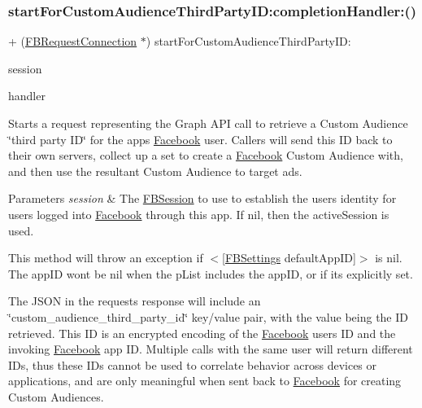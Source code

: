 \subsubsection{\texorpdfstring{start\+For\+Custom\+Audience\+Third\+Party\+I\+D\+:completion\+Handler\+:()}{startForCustomAudienceThirdPartyID:completionHandler:()}\hspace{0.1cm}{\footnotesize\ttfamily [5/5]}}
{\footnotesize\ttfamily + (\hyperlink{interfaceFBRequestConnection}{F\+B\+Request\+Connection} $\ast$) start\+For\+Custom\+Audience\+Third\+Party\+I\+D\+: \begin{DoxyParamCaption}\item[{(\hyperlink{interfaceFBSession}{F\+B\+Session} $\ast$)}]{session }\item[{completionHandler:(F\+B\+Request\+Handler)}]{handler }\end{DoxyParamCaption}}

Starts a request representing the Graph A\+PI call to retrieve a Custom Audience \char`\"{}third party I\+D\char`\"{} for the app\textquotesingle{}s \hyperlink{interfaceFacebook}{Facebook} user. Callers will send this ID back to their own servers, collect up a set to create a \hyperlink{interfaceFacebook}{Facebook} Custom Audience with, and then use the resultant Custom Audience to target ads.


\begin{DoxyParams}{Parameters}
{\em session} & The \hyperlink{interfaceFBSession}{F\+B\+Session} to use to establish the user\textquotesingle{}s identity for users logged into \hyperlink{interfaceFacebook}{Facebook} through this app. If {\ttfamily nil}, then the active\+Session is used.\\
\hline
\end{DoxyParams}
This method will throw an exception if $<$\mbox{[}\hyperlink{interfaceFBSettings}{F\+B\+Settings} default\+App\+ID\mbox{]}$>$ is {\ttfamily nil}. The app\+ID won\textquotesingle{}t be nil when the p\+List includes the app\+ID, or if it\textquotesingle{}s explicitly set.

The J\+S\+ON in the request\textquotesingle{}s response will include an \char`\"{}custom\+\_\+audience\+\_\+third\+\_\+party\+\_\+id\char`\"{} key/value pair, with the value being the ID retrieved. This ID is an encrypted encoding of the \hyperlink{interfaceFacebook}{Facebook} user\textquotesingle{}s ID and the invoking \hyperlink{interfaceFacebook}{Facebook} app ID. Multiple calls with the same user will return different I\+Ds, thus these I\+Ds cannot be used to correlate behavior across devices or applications, and are only meaningful when sent back to \hyperlink{interfaceFacebook}{Facebook} for creating Custom Audiences.

